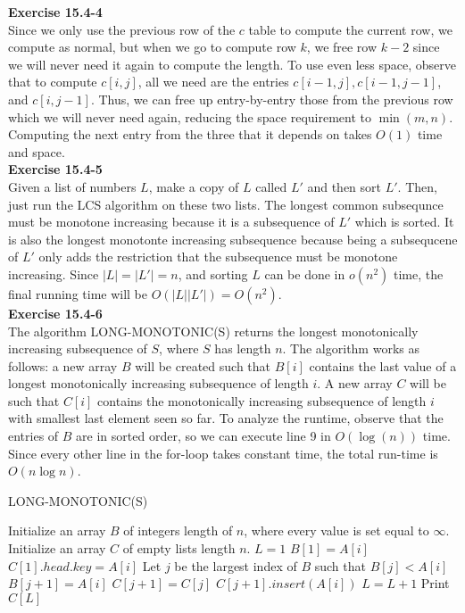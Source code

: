 \documentclass{article}
\begin{document}
\noindent\textbf{Exercise 15.4-4}\\

Since we only use the previous row of the $c$ table to compute the current row, we compute as normal, but when we go to compute row $k$, we free row $k-2$ since we will never need it again to compute the length.  To use even less space, observe that to compute $c[i,j]$, all we need are the entries $c[i-1,j], c[i-1,j-1]$, and $c[i,j-1]$.  Thus, we can free up entry-by-entry those from the previous row which we will never need again, reducing the space requirement to $\min(m,n)$.  Computing the next entry from the three that it depends on takes $O(1)$ time and space.\\


\noindent\textbf{Exercise 15.4-5}\\

Given a list of numbers $L$, make a copy of $L$ called $L'$ and then sort $L'$. Then, just run the LCS algorithm on these two lists. The longest common subsequnce must be monotone increasing because it is a subsequence of $L'$ which is sorted. It is also the longest monotonte increasing subsequence because being a subsequcene of $L'$ only adds the restriction that the subsequence must be monotone increasing. Since $|L|=|L'| =n$, and sorting $L$ can be done in $o(n^2)$ time, the final running time will be $O(|L||L'|) = O(n^2)$.\\

\noindent\textbf{Exercise 15.4-6}\\

The algorithm LONG-MONOTONIC(S) returns the longest monotonically increasing subsequence of $S$, where $S$ has length $n$.  The algorithm works as follows: a new array $B$ will be created such that $B[i]$ contains the last value of a longest monotonically increasing subsequence of length $i$.  A new array $C$ will be such that $C[i]$ contains the monotonically increasing subsequence of length $i$ with smallest last element seen so far. To analyze the runtime, observe that the entries of $B$ are in sorted order, so we can execute line 9 in $O(\log(n))$ time.  Since every other line in the for-loop takes constant time, the total run-time is $O(n\log n)$.


\begin{algorithm}
\caption{LONG-MONOTONIC(S)}
\begin{algorithmic}[1]
\State Initialize an array $B$ of integers length of $n$, where every value is set equal to $\infty$.
\State Initialize an array $C$ of empty lists length $n$.
\State $L=1$
		\State $B[1] = A[i]$
		\State $C[1].head.key = A[i]$
	\Else
		\State Let $j$ be the largest index of $B$ such that $B[j] < A[i]$
		\State $B[j+1] = A[i]$
		\State $C[j+1] = C[j]$
		\State $C[j+1].insert(A[i])$
			\State $L = L + 1$
		\EndIf
	\EndIf
\EndFor
\State Print $C[L]$
\end{algorithmic}
\end{algorithm}
\end{document}
